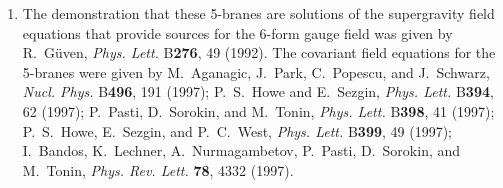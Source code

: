 \begin{enumerate}
  \item {}\label{ch32-ref-13}
  The demonstration that these 5-branes are solutions of the
  supergravity field equations that provide sources for the 6-form
  gauge field was given by R.~G\"uven, \textit{Phys. Lett.}
  B\textbf{276}, 49 (1992). The covariant field equations for the
  5-branes were given by M.~Aganagic, J.~Park, C.~Popescu, and
  J.~Schwarz, \textit{Nucl. Phys.} B\textbf{496}, 191 (1997);
  P.~S.~Howe and E.~Sezgin, \textit{Phys. Lett.} B\textbf{394}, 62
  (1997); P.~Pasti, D.~Sorokin, and M.~Tonin, \textit{Phys. Lett.}
  B\textbf{398}, 41 (1997); P.~S.~Howe, E.~Sezgin, and P.~C.~West,
  \textit{Phys. Lett.} B\textbf{399}, 49 (1997); I.~Bandos,
  K.~Lechner, A.~Nurmagambetov, P.~Pasti, D.~Sorokin, and M.~Tonin,
  \textit{Phys. Rev. Lett.} \textbf{78}, 4332 (1997).
\end{enumerate}
